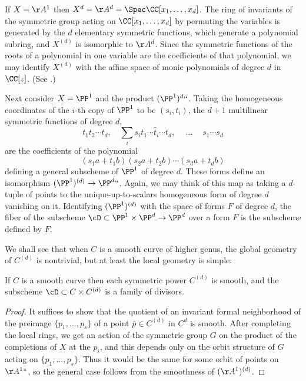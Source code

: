 If $X=\AA^{1}$ then $X^{d} = \AA^{d} = \Spec \CC[x_{1}, \dots,
x_{d}]$. The ring of 
invariants of the symmetric group
%
acting on
$\CC[x_{1}, \dots, x_{d}]$ by permuting the variables is generated by the $d$ 
%
elementary symmetric functions, which generate a polynomial subring, and $X^{(d)}$ is isomorphic to $\AA^{d}$. Since the symmetric functions of the roots of a polynomial in one variable are the coefficients of
that polynomial, we may identify $X^{(d)}$ with the affine space of
monic polynomials of degree $d$ in~$\CC[z]$.
(See \cite[Exercises 1.6, 13.2, 13.3, 13.4]{Eisenbud1995}.)

Next consider $X = \PP^1$ and the product $(\PP^1)^d` `$. Taking the homogeneous coordinates of the
$i$-th copy of $\PP^1$ to be $(s_i,t_i)$, the $d+1$ multilinear symmetric functions of degree $d$,
$$
t_1t_2\cdots t_d,\quad \sum_i s_it_1\cdots\hat t_i\cdots t_d,\ \quad \dots \quad\ s_1\cdots s_d
$$
are the coefficients of the polynomial
$$
(s_1a + t_1b)(s_2a + t_2b)\cdots(s_da + t_db)
$$
defining a general 
subscheme
of $\PP^1$ of degree $d$. These forms  define
an isomorphism $(\PP^1)^{(d)} \to \PP^d` `$. 
Again, we may think of this map as taking a $d$-tuple of points to the unique-up-to-scalars
homogeneous form of degree $d$ vanishing on it.
Identifying $(\PP^1)^{(d)}$ with the space of forms
$F$ of degree $d$, the fiber of the subscheme $\cD\subset \PP^1 \times \PP^d \to \PP^d$
over a form $F$ is the subscheme defined by $F$.

We shall see that when $C$ is a smooth curve of higher genus, the global geometry of $C^{(d)}$ is nontrivial, but at least the local geometry is simple:

\begin{proposition}
If $C$ is a smooth curve then each symmetric power $C^{(d)}$ is smooth, and the subscheme
$\cD \subset C\times C^{(d)}$ is a family of divisors.
\unif
\end{proposition}

\begin{proof}
It suffices to
 show that the quotient of an invariant 
formal neighborhood
of the preimage $\{p_1,\dots, p_s\}$ of a point
 $\bar p\in C^{(d)}$ in $C^d$  is smooth. After completing the local rings, we get an action of the symmetric group
 $G$ on the product of the completions of $X$ at the $p_i$, and this depends only on the orbit
 structure of $G$ acting on $\{p_1,\dots, p_s\}$. Thus it would be the same for some orbit of
 points on $\AA^1` `$, so the general case follows from the smoothness of $(\AA^{1})^{(d)}$.
\unif
 \end{proof}


